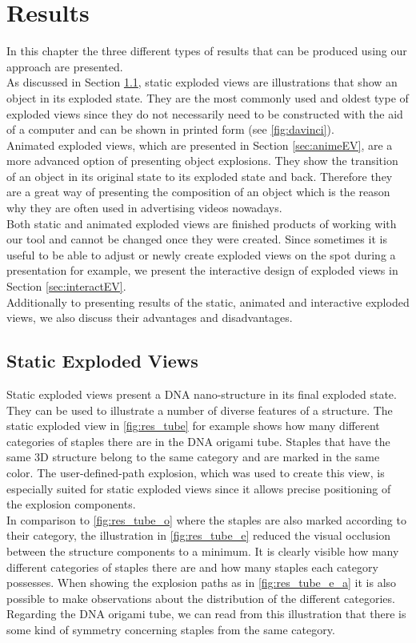 \documentclass[draft,final]{vutinfth} %
\begin{document}
\chapter{Results}
\label{chap:result}
In this chapter the three different types of results that can be produced using our approach are presented.
\\ As discussed in Section \ref{sec:staticEV}, static exploded views are illustrations that show an object in its exploded state. They are the most commonly used and oldest type of exploded views since they do not necessarily need to be constructed with the aid of a computer and can be shown in printed form (see \autoref{fig:davinci}).
\\ Animated exploded views, which are presented in Section \ref{sec:animeEV}, are a more advanced option of presenting object explosions. They show the transition of an object in its original state to its exploded state and back. Therefore they are a great way of presenting the composition of an object which is the reason why they are often used in advertising videos nowadays.
\\ Both static and animated exploded views are finished products of working with our tool and cannot be changed once they were created. Since sometimes it is useful to be able to adjust or newly create exploded views on the spot during a presentation for example, we present the interactive design of exploded views in Section \ref{sec:interactEV}.
\\ Additionally to presenting results of the static, animated and interactive exploded views, we also discuss their advantages and disadvantages.


\section{Static Exploded Views}
\label{sec:staticEV}

Static exploded views present a DNA nano-structure in its final exploded state. They can be used to illustrate a number of diverse features of a structure. The static exploded view in \autoref{fig:res_tube} for example shows how many different categories of staples there are in the DNA origami tube. Staples that have the same 3D structure belong to the same category and are marked in the same color. The user-defined-path explosion, which was used to create this view, is especially suited for static exploded views since it allows precise positioning of the explosion components. 
\\ In comparison to \autoref{fig:res_tube_o} where the staples are also marked according to their category, the illustration in \autoref{fig:res_tube_e} reduced the visual occlusion between the structure components to a minimum. It is clearly visible how many different categories of staples there are and how many staples each category possesses. When showing the explosion paths as in \autoref{fig:res_tube_e_a} it is also possible to make observations about the distribution of the different categories. Regarding the DNA origami tube, we can read from this illustration that there is some kind of symmetry concerning staples from the same category.
\end{document}

